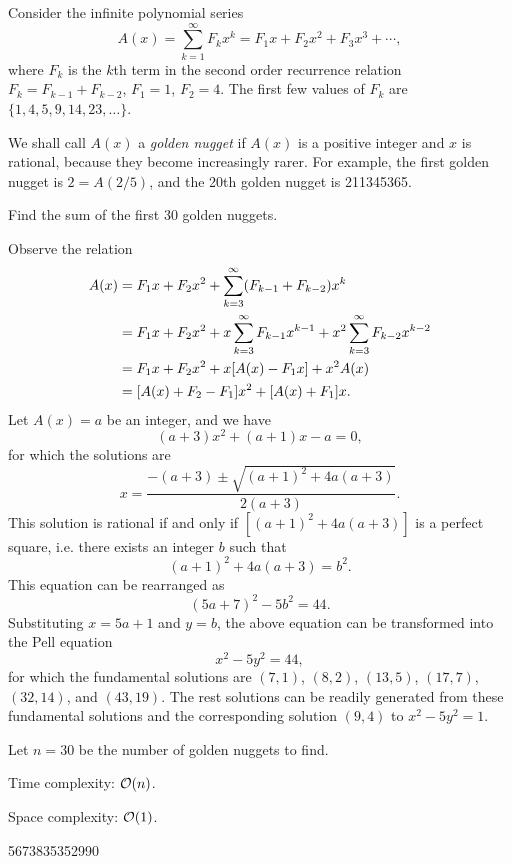 




Consider the infinite polynomial series
\[
A(x) = \sum_{k=1}^{\infty} F_k x^k = F_1 x + F_2 x^2 + F_3 x^3 + \cdots ,
\]
where $F_k$ is the $k$th term in the second order recurrence relation $F_k = F_{k-1} + F_{k-2}$, $F_1 = 1$, $F_2 = 4$. The first few values of $F_k$ are $\{ 1, 4, 5, 9, 14, 23, \ldots \}$.

We shall call $A(x)$ a \emph{golden nugget} if $A(x)$ is a positive integer and $x$ is rational, because they become increasingly rarer. For example, the first golden nugget is $2 = A(2/5)$, and the 20th golden nugget is 211345365.

Find the sum of the first 30 golden nuggets.

\solution

Observe the relation
\begin{align}
A(x) &= F_1 x + F_2 x^2 + \sum_{k=3}^{\infty} (F_{k-1}+F_{k-2}) x^k \notag \\
&= F_1 x + F_2 x^2 + x \sum_{k=3}^{\infty} F_{k-1} x^{k-1} + x^2 \sum_{k=3}^{\infty} F_{k-2} x^{k-2} \notag \\
&= F_1 x + F_2 x^2 + x[A(x) - F_1 x] + x^2 A(x)  \notag \\
&= [A(x)+F_2-F_1] x^2 + [A(x)+F_1] x . \notag
\end{align}
Let $A(x) = a$ be an integer, and we have
\[
(a+3) x^2 + (a+1) x - a = 0 ,
\]
for which the solutions are
\[
x = \frac{-(a+3) \pm \sqrt{(a+1)^2 + 4a(a+3)} }{2(a+3)} .
\]
This solution is rational if and only if $[(a+1)^2+4a(a+3)]$ is a perfect square, i.e. there exists an integer $b$ such that
\[
(a+1)^2 + 4a(a+3) = b^2 .
\]
This equation can be rearranged as
\[
(5a+7)^2 - 5b^2 = 44.
\]
Substituting $x = 5a+1$ and $y = b$, the above equation can be transformed into the Pell equation
\[
x^2 - 5 y^2 = 44,
\]
for which the fundamental solutions are $(7,1)$, $(8,2)$, $(13,5)$, $(17,7)$, $(32,14)$, and $(43,19)$. The rest solutions can be readily generated from these fundamental solutions and the corresponding solution $(9, 4)$ to $x^2 - 5 y^2 = 1$.

\complexity

Let $n = 30$ be the number of golden nuggets to find.

Time complexity: $\mathcal{O}(n)$.

Space complexity: $\mathcal{O}(1)$.

\answer

5673835352990


